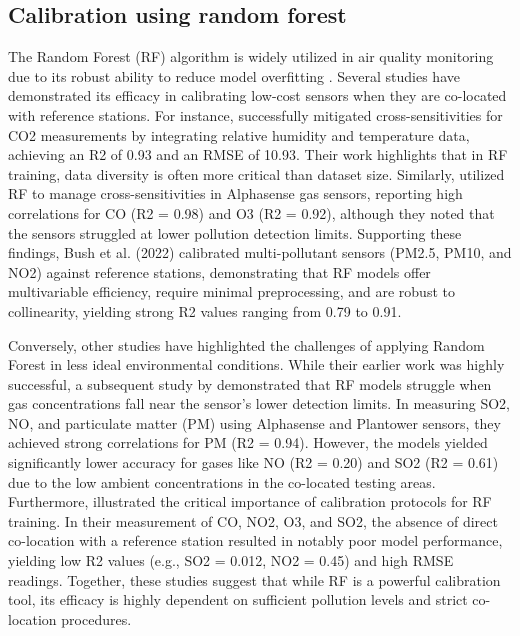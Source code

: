 \subsection{Calibration using random forest} %
The Random Forest (RF) algorithm is widely utilized in air quality monitoring due to its robust ability to reduce model overfitting \cite{Concas_2021}. Several studies have demonstrated its efficacy in calibrating low-cost sensors when they are co-located with reference stations. For instance, \cite{Araujo_2023} successfully mitigated cross-sensitivities for CO2 measurements by integrating relative humidity and temperature data, achieving an R2 of 0.93 and an RMSE of 10.93. Their work highlights that in RF training, data diversity is often more critical than dataset size. Similarly, \cite{Ionascu_2021} utilized RF to manage cross-sensitivities in Alphasense gas sensors, reporting high correlations for CO (R2 = 0.98) and O3 (R2 = 0.92), although they noted that the sensors struggled at lower pollution detection limits. Supporting these findings, Bush et al. (2022) calibrated multi-pollutant sensors (PM2.5, PM10, and NO2) against reference stations, demonstrating that RF models offer multivariable efficiency, require minimal preprocessing, and are robust to collinearity, yielding strong R2 values ranging from 0.79 to 0.91. 

Conversely, other studies have highlighted the challenges of applying Random Forest in less ideal environmental conditions. While their earlier work was highly successful, a subsequent study by \cite{Ionascu_2024} demonstrated that RF models struggle when gas concentrations fall near the sensor's lower detection limits. In measuring SO2, NO, and particulate matter (PM) using Alphasense and Plantower sensors, they achieved strong correlations for PM (R2 = 0.94). However, the models yielded significantly lower accuracy for gases like NO (R2 = 0.20) and SO2 (R2 = 0.61) due to the low ambient concentrations in the co-located testing areas. Furthermore, \cite{Han_2021} illustrated the critical importance of calibration protocols for RF training. In their measurement of CO, NO2, O3, and SO2, the absence of direct co-location with a reference station resulted in notably poor model performance, yielding low R2 values (e.g., SO2 = 0.012, NO2 = 0.45) and high RMSE readings. Together, these studies suggest that while RF is a powerful calibration tool, its efficacy is highly dependent on sufficient pollution levels and strict co-location procedures. 

